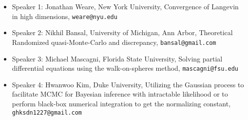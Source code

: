 \documentclass[12pt,a4paper,figuresright]{book}
\begin{document}
\begin{itemize}

\item Speaker 1: Jonathan Weare, New York University, Convergence of Langevin in high dimensions, \texttt{weare@nyu.edu}
    
\item Speaker 2: Nikhil Bansal, University of Michigan, Ann Arbor, Theoretical Randomized quasi-Monte-Carlo and discrepancy, \texttt{bansal@gmail.com}
    
\item Speaker 3: Michael Mascagni, Florida State University, Solving partial differential equations using the walk-on-spheres method, \texttt{mascagni@fsu.edu}
    
\item Speaker 4: Hwanwoo Kim, Duke University, Utilizing the Gaussian process to facilitate MCMC for Bayesian inference with intractable likelihood or to perform black-box numerical integration to get the normalizing constant, \texttt{ghksdn1227@gmail.com}
\end{itemize}



\begin{comment}
If you would like to include references, please do so by creating a simple list numbered by [1], [2], [3], \ldots. See example below.
Please do not use the \texttt{bibliography} environment or \texttt{bibtex} files.
\begin{enumerate}
	
\item[{[1]}] Niederreiter, Harald (1992). {\it Random number generation and quasi-Monte Carlo methods}. Society for Industrial and Applied Mathematics (SIAM).
	
\item[{[2]}] Roberts, Gareth O, \& Rosenthal, Jeffrey S. (2002).  Optimal scaling for various Metropolis-Hastings algorithms, \textbf{16}(4), 351--367.
\end{enumerate}

Equations may be used if they are referenced. Please note that the equation numbers may be different (but will be cross-referenced correctly) in the final program book.
\end{comment}
\end{document}
